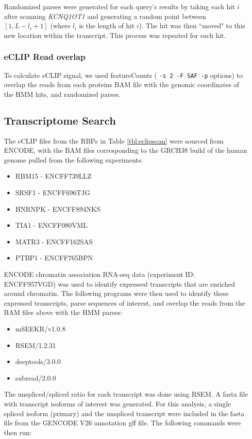 Randomized parses were generated for each query's results by taking each hit $i$ after scanning \textit{KCNQ1OT1} and generating a random point between $[1,L-l_i+1]$ (where $l_i$ is the length of hit $i$). The hit was then ``moved" to this new location within the transcript. This process was repeated for each hit. 
\subsubsection{eCLIP Read overlap}

To calculate eCLIP signal, we used featureCounts ( \texttt{-s 2 -F SAF -p} options) to overlap the reads from each proteins BAM file with the genomic coordinates of the HMM hits, and randomized parses. 

\subsection{Transcriptome Search}
The eCLIP files from the RBPs in Table \ref{tbl:eclipscan} were sourced from ENCODE, with the BAM files corresponding to the GRCH38 build of the human genome pulled from the following experiments: 

\begin{itemize}
  \item RBM15 - ENCFF739LLZ
  \item SRSF1 - ENCFF696TJG
  \item HNRNPK - ENCFF894NKS
  \item TIA1 - ENCFF080VML
  \item MATR3 - ENCFF162SAS
  \item PTBP1 - ENCFF765BPN
\end{itemize}

ENCODE chromatin association RNA-seq data (experiment ID: ENCFF957VGD) was used to identify expressed transcripts that are enriched around chromatin. The following programs were then used to identify these expressed transcripts, parse sequences of interest, and overlap the reads from the BAM files above with the HMM parses: 

\begin{itemize}
   \item mSEEKR/v1.0.8
    \item RSEM/1.2.31
    \item deeptools/3.0.0
    \item  subread/2.0.0
\end{itemize}

The unspliced/spliced ratio for each transcript was done using RSEM. A fasta file with transcript isoforms of interest was generated. For this analysis, a single spliced isoform (primary) and the unspliced transcript were included in the fasta file from the GENCODE V26 annotation gff file. The following commands were then run: 

